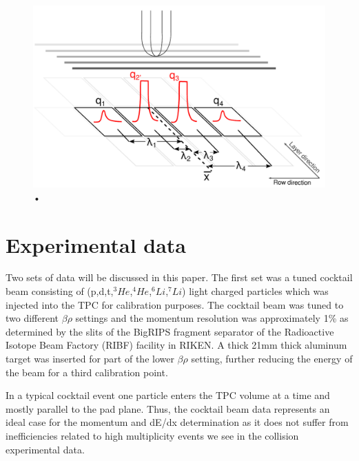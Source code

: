 \documentclass[review]{elsarticle}
\begin{document}
\begin{figure}[ht]
\includegraphics[width=\linewidth]{saturated_pads}
\caption{•}
\label{fig:satpad}
\end{figure}

\section{Experimental data}

Two sets of data will be discussed in this paper. The first set was a tuned cocktail beam consisting of (p,d,t,${}^3He$,${}^4He$,${}^6Li$,${}^7Li$) light charged particles which was injected into the TPC for calibration purposes. The cocktail beam was tuned to two different $\beta\rho$ settings and the momentum resolution was approximately 1\% as determined by the slits of the BigRIPS fragment separator of the Radioactive Isotope Beam Factory (RIBF) facility in RIKEN. A thick 21mm thick aluminum target was inserted for part of the lower $\beta\rho$ setting, further reducing the energy of the beam for a third calibration point. 

In a typical cocktail event one particle enters the TPC volume at a time and mostly parallel to the pad plane. Thus, the cocktail beam data represents an ideal case for the momentum and dE/dx determination as it does not suffer from inefficiencies related to high multiplicity events we see in the collision experimental data.  
\end{document}
